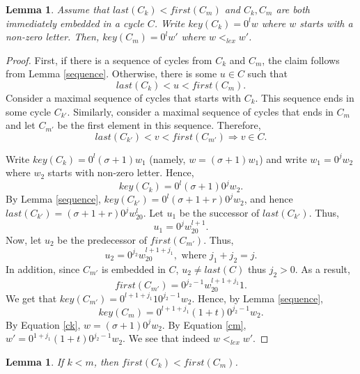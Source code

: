 \documentclass{article}
\newtheorem{lemma}[theorem]{Lemma}
\theoremstyle{definition}
\begin{document}
\begin{lemma}
	\label{both-embedded}
	Assume that $last(C_k)<first(C_m)$ and $C_k,C_m$ are both immediately embedded in a cycle $C$. Write $key(C_k)=0^lw$ where $w$ starts with a non-zero letter. Then, $key(C_m)=0^lw'$ where $w<_{lex}w'$.
\end{lemma}
\begin{proof}
	First, if there is a sequence of cycles from $C_k$ and $C_m$, the claim follows from Lemma \ref{sequence}. Otherwise, there is some $u\in C$ such that
	$$last(C_k)<u<first(C_m).$$
	Consider a  maximal sequence of cycles that starts with $C_k$. This sequence ends in some cycle $C_{k'}$. Similarly, consider a maximal sequence of cycles that ends in $C_m$ and let $C_{m'}$ be the first element in this sequence. Therefore,
	$$last(C_{k'}) <v<first(C_{m'})\Longrightarrow v\in C.$$
	
	Write $key(C_k)=0^l(\sigma+1)w_1$ (namely, $w=(\sigma+1)w_1$) and write  $w_1=0^jw_2$ where $w_2$ starts with non-zero letter. Hence, 
	\begin{equation}
	\label{ck}
	key(C_k)=0^l(\sigma+1)0^jw_2.
	\end{equation}
	By Lemma \ref{sequence}, $key(C_{k'})=0^l(\sigma+1+r)0^jw_2$, and hence $last(C_{k'})=(\sigma+1+r)0^jw_20^l$. Let $u_1$ be the successor of $last(C_{k'})$. Thus,
	$$u_1=0^jw_20^{l+1}.$$
	Now, let $u_2$ be the predecessor of $first(C_{m'})$. Thus,
	$$u_2=0^{j_2}w_20^{l+1+j_1}, \text{ where } j_1+j_2=j.$$
	In addition, since $C_{m'}$ is embedded in $C$, $u_2\neq last(C)$ thus $j_2>0$. As a result, $$first(C_{m'})=0^{j_2-1}w_20^{l+1+j_1}1.$$
	We get that $key(C_{m'})=0^{l+1+j_1}10^{j_2-1}w_2$. Hence, by Lemma \ref{sequence}, 
	\begin{equation}
	\label{cm}
	key(C_m)=0^{l+1+j_1}(1+t)0^{j_2-1}w_2.
	\end{equation}
	By Equation \ref{ck}, $w=(\sigma+1)0^{j}w_2$. By Equation \ref{cm}, $w'=0^{1+j_1}(1+t)0^{j_2-1}w_2$. We see that indeed $w<_{lex}w'$.
\end{proof}

\begin{lemma}
	\label{first-ordering}
	If $k<m$, then $first(C_k)<first (C_m)$.
\end{lemma}
\end{document}
